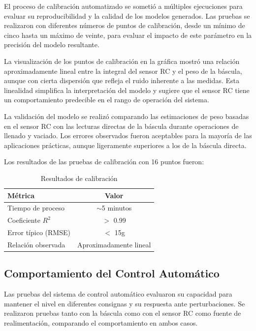 \documentclass[12pt,a4paper]{article}
\begin{document}
El proceso de calibración automatizado se sometió a múltiples ejecuciones para evaluar su reproducibilidad y la calidad de los modelos generados. Las pruebas se realizaron con diferentes números de puntos de calibración, desde un mínimo de cinco hasta un máximo de veinte, para evaluar el impacto de este parámetro en la precisión del modelo resultante.

La visualización de los puntos de calibración en la gráfica mostró una relación aproximadamente lineal entre la integral del sensor RC y el peso de la báscula, aunque con cierta dispersión que refleja el ruido inherente a las medidas. Esta linealidad simplifica la interpretación del modelo y sugiere que el sensor RC tiene un comportamiento predecible en el rango de operación del sistema.

La validación del modelo se realizó comparando las estimaciones de peso basadas en el sensor RC con las lecturas directas de la báscula durante operaciones de llenado y vaciado. Los errores observados fueron aceptables para la mayoría de las aplicaciones prácticas, aunque ligeramente superiores a los de la báscula directa.

Los resultados de las pruebas de calibración con 16 puntos fueron:

\begin{table}[H]
\centering
\caption{Resultados de calibración}
\begin{tabular}{@{}lc@{}}
\toprule
\textbf{Métrica} & \textbf{Valor} \\
\midrule
Tiempo de proceso & $\sim$5 minutos \\
Coeficiente $R^2$ & $>$ 0.99 \\
Error típico (RMSE) & $<$ 15g \\
Relación observada & Aproximadamente lineal \\
\bottomrule
\end{tabular}
\end{table}

\subsection{Comportamiento del Control Automático}

Las pruebas del sistema de control automático evaluaron su capacidad para mantener el nivel en diferentes consignas y su respuesta ante perturbaciones. Se realizaron pruebas tanto con la báscula como con el sensor RC como fuente de realimentación, comparando el comportamiento en ambos casos.
\end{document}
